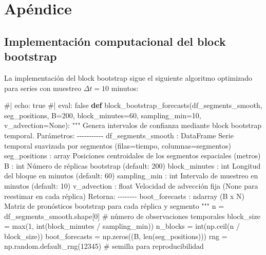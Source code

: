 \documentclass[
  spanish,
  us-letterpaper,
]{scrreprt}
\newenvironment{Shaded}{\begin{snugshade}}{\end{snugshade}}
\newcommand{\BuiltInTok}[1]{\textcolor[rgb]{0.00,0.23,0.31}{#1}}
\newcommand{\CommentTok}[1]{\textcolor[rgb]{0.37,0.37,0.37}{#1}}
\newcommand{\DecValTok}[1]{\textcolor[rgb]{0.68,0.00,0.00}{#1}}
\newcommand{\KeywordTok}[1]{\textcolor[rgb]{0.00,0.23,0.31}{\textbf{#1}}}
\newcommand{\NormalTok}[1]{\textcolor[rgb]{0.00,0.23,0.31}{#1}}
\newcommand{\OperatorTok}[1]{\textcolor[rgb]{0.37,0.37,0.37}{#1}}
\newcommand{\VariableTok}[1]{\textcolor[rgb]{0.07,0.07,0.07}{#1}}
\numberwithin{equation}{section}
\begin{document}
\chapter{Apéndice}\label{apuxe9ndice-1}

\section{Implementación computacional del block
bootstrap}\label{sec-apendice-bootstrap}

La implementación del block bootstrap sigue el siguiente algoritmo
optimizado para series con muestreo \(\Delta t = 10\) minutos:

\begin{Shaded}
\begin{Highlighting}[]
\CommentTok{\#| echo: true}
\CommentTok{\#| eval: false}
\KeywordTok{def}\NormalTok{ block\_bootstrap\_forecasts(df\_segments\_smooth, seg\_positions, }
\NormalTok{                              B}\OperatorTok{=}\DecValTok{200}\NormalTok{, block\_minutes}\OperatorTok{=}\DecValTok{60}\NormalTok{, }
\NormalTok{                              sampling\_min}\OperatorTok{=}\DecValTok{10}\NormalTok{, v\_advection}\OperatorTok{=}\VariableTok{None}\NormalTok{):}
    \CommentTok{"""}
\CommentTok{    Genera intervalos de confianza mediante block bootstrap temporal.}
\CommentTok{    }
\CommentTok{    Parámetros:}
\CommentTok{    {-}{-}{-}{-}{-}{-}{-}{-}{-}{-}{-}}
\CommentTok{    df\_segments\_smooth : DataFrame}
\CommentTok{        Serie temporal suavizada por segmentos}
\CommentTok{        (filas=tiempo, columnas=segmentos)}
\CommentTok{    seg\_positions : array}
\CommentTok{        Posiciones centroidales de los segmentos espaciales (metros)}
\CommentTok{    B : int}
\CommentTok{        Número de réplicas bootstrap (default: 200)}
\CommentTok{    block\_minutes : int}
\CommentTok{        Longitud del bloque en minutos (default: 60)}
\CommentTok{    sampling\_min : int}
\CommentTok{        Intervalo de muestreo en minutos (default: 10)}
\CommentTok{    v\_advection : float}
\CommentTok{        Velocidad de advección fija (None para reestimar en cada réplica)}
\CommentTok{    }
\CommentTok{    Retorna:}
\CommentTok{    {-}{-}{-}{-}{-}{-}{-}{-}}
\CommentTok{    boot\_forecasts : ndarray (B x N)}
\CommentTok{        Matriz de pronósticos bootstrap para cada réplica y segmento}
\CommentTok{    """}
\NormalTok{    n }\OperatorTok{=}\NormalTok{ df\_segments\_smooth.shape[}\DecValTok{0}\NormalTok{]  }\CommentTok{\# número de observaciones temporales}
\NormalTok{    block\_size }\OperatorTok{=} \BuiltInTok{max}\NormalTok{(}\DecValTok{1}\NormalTok{, }\BuiltInTok{int}\NormalTok{(block\_minutes }\OperatorTok{/}\NormalTok{ sampling\_min))}
\NormalTok{    n\_blocks }\OperatorTok{=} \BuiltInTok{int}\NormalTok{(np.ceil(n }\OperatorTok{/}\NormalTok{ block\_size))}
\NormalTok{    boot\_forecasts }\OperatorTok{=}\NormalTok{ np.zeros((B, }\BuiltInTok{len}\NormalTok{(seg\_positions)))}
\NormalTok{    rng }\OperatorTok{=}\NormalTok{ np.random.default\_rng(}\DecValTok{12345}\NormalTok{)  }\CommentTok{\# semilla para reproducibilidad}
    

\end{Highlighting}
\end{Shaded}
\end{document}
